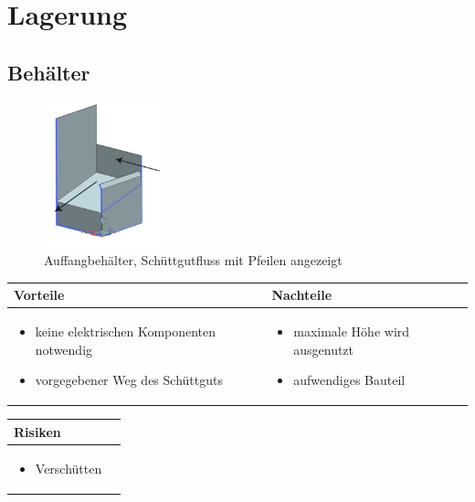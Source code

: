 
\section{Lagerung}


\subsection{Behälter}

\begin{figure} [hbp]
	\centering
	\includegraphics[width=0.3\textwidth]{fig/Unbenannt-1.png}
	\caption{Auffangbehälter, Schüttgutfluss mit Pfeilen angezeigt}
\end{figure}

\begin{table}[h]
\begin{tabular}{p{} | p{}}


 \textbf{Vorteile} & \textbf{Nachteile} \\ \hline
	 
\begin{itemize}
\item keine elektrischen Komponenten notwendig
\item vorgegebener Weg des Schüttguts
\end{itemize}

 
 &
 
\begin{itemize}
\item maximale Höhe wird ausgenutzt
\item aufwendiges Bauteil
\end{itemize}

\end{tabular}
\end{table}

\begin{table}[h]
\begin{tabular}{p{}p{}}


 \textbf{Risiken} & \\ \hline
	 
\begin{itemize}
\item Verschütten
\end{itemize}

 
\end{tabular}
\end{table}

\pagebreak
